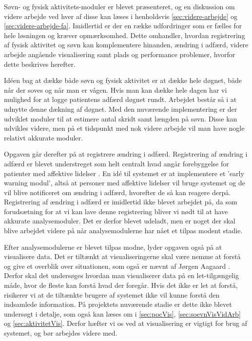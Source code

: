 Søvn- og fysisk aktivitets-moduler er blevet præsenteret, og en diskussion om videre arbejde ved hver af disse kan læses i henholdsvis \cref{sec:videre-arbejde} og \cref{sec:videre-arbejde-fa}.
Imidlertid er der en række udfordringer som er fælles for hele løsningen og kræver opmærksomhed.
Dette omhandler, hvordan registrering af fysisk aktivitet og søvn kan komplementere hinanden, ændring i adfærd,  videre arbejde angående visualisering samt plads og performance problemer, hvorfor dette beskrives herefter.

Idéen bag at dække både søvn og fysisk aktivitet er at dække hele døgnet, både når der soves og når man er vågen. 
Hvis man kan dække hele dagen har vi mulighed for at logge patientens adfærd døgnet rundt.
Arbejdet består så i at udnytte denne dækning af døgnet.
Med den nuværende implementering er der udviklet moduler til at estimere antal skridt samt længden på søvn.
Disse kan udvikles videre, men på et tidspunkt med nok videre arbejde vil man have nogle relativt akkurate moduler.

Opgaven går derefter på at registrere ændring i adfærd. 
Registrering af ændring i adfærd er blevet understreget som helt centralt hvad angår forebyggelse for patienter med affektive lidelser \citep[Kapitel 1, Sektion 4]{misc:faellesrapp} .
En idé til systemet er at implementere et 'early warning modul', altså at personer med affektive lidelser vil bruge systemet og de vil blive notificeret om ændring i adfærd, hvorefter de så kan reagere derpå. 
Registrering af ændring i adfærd er imidlertid ikke blevet arbejdet på, da som forudsætning for at vi kan lave denne registrering bliver vi nødt til at have akkurate analysemoduler.
Det er derfor blevet udeladt, men er noget der skal blive arbejdet videre på når analysemodulerne har nået et tilpas modent stadie.

Efter analysemodulerne er blevet tilpas modne, lyder opgaven også på at visualisere data.
Det er tiltænkt at visualiseringerne skal være nemme at forstå og give et overblik over situationen, som også er nævnt af Jørgen Aagaard \citep[Kapitel 1, Sektion 4]{misc:faellesrapp} . 
Derfor skal det undersøges hvordan man visualiserer data på en let-tilgængelig måde, hvor de fleste kan forstå hvad der foregår. 
Hvis det ikke er let at forstå, risikerer vi at de tiltænkte brugere af systemet ikke vil kunne forstå den indsamlede information.
På projektets nuværende stadie er dette ikke blevet undersøgt i detalje, som også kan læses om i \cref{sec:pocVis}, \cref{sec:soevnVisVidArb} og \cref{sec:aktivitetVis}. 
Derfor hæfter vi os ved at visualisering er vigtigt for brug af systemet, og bør arbejdes videre med.

